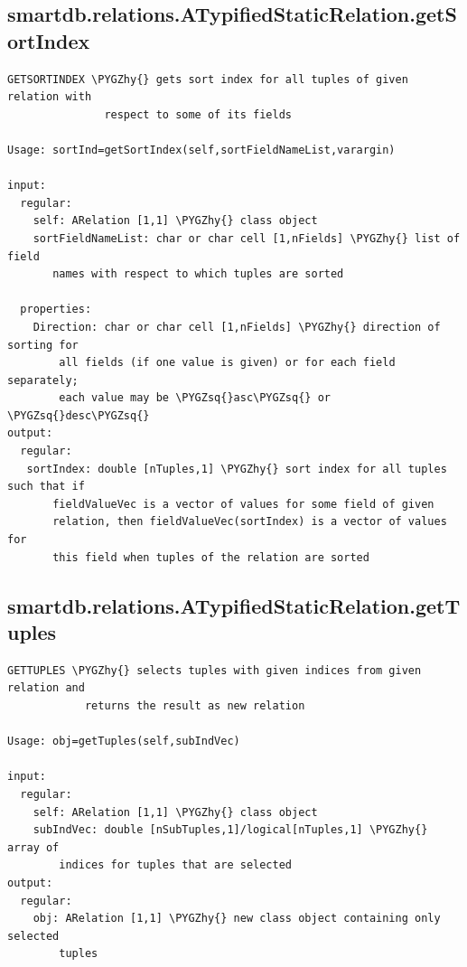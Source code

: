 \documentclass[letterpaper,10pt,english]{sphinxmanual}
\def\PYGZhy{\char`\-}
\def\PYGZsq{\char`\'}
\begin{document}
\subsection{smartdb.relations.ATypifiedStaticRelation.getSortIndex}
\label{chap_functions:smartdb-relations-atypifiedstaticrelation-getsortindex}
\begin{Verbatim}[commandchars=\\\{\}]
GETSORTINDEX \PYGZhy{} gets sort index for all tuples of given relation with
               respect to some of its fields

Usage: sortInd=getSortIndex(self,sortFieldNameList,varargin)

input:
  regular:
    self: ARelation [1,1] \PYGZhy{} class object
    sortFieldNameList: char or char cell [1,nFields] \PYGZhy{} list of field
       names with respect to which tuples are sorted

  properties:
    Direction: char or char cell [1,nFields] \PYGZhy{} direction of sorting for
        all fields (if one value is given) or for each field separately;
        each value may be \PYGZsq{}asc\PYGZsq{} or \PYGZsq{}desc\PYGZsq{}
output:
  regular:
   sortIndex: double [nTuples,1] \PYGZhy{} sort index for all tuples such that if
       fieldValueVec is a vector of values for some field of given
       relation, then fieldValueVec(sortIndex) is a vector of values for
       this field when tuples of the relation are sorted
\end{Verbatim}


\subsection{smartdb.relations.ATypifiedStaticRelation.getTuples}
\label{chap_functions:smartdb-relations-atypifiedstaticrelation-gettuples}
\begin{Verbatim}[commandchars=\\\{\}]
GETTUPLES \PYGZhy{} selects tuples with given indices from given relation and
            returns the result as new relation

Usage: obj=getTuples(self,subIndVec)

input:
  regular:
    self: ARelation [1,1] \PYGZhy{} class object
    subIndVec: double [nSubTuples,1]/logical[nTuples,1] \PYGZhy{} array of
        indices for tuples that are selected
output:
  regular:
    obj: ARelation [1,1] \PYGZhy{} new class object containing only selected
        tuples
\end{Verbatim}
\end{document}
